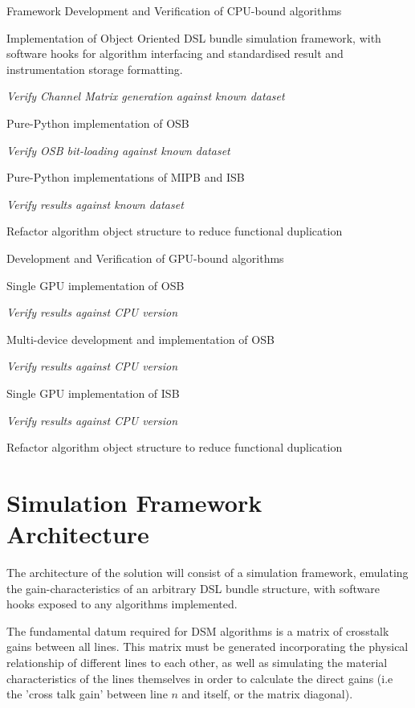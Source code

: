 \begin{enumerate*}
  \item Framework Development and Verification of CPU-bound algorithms
  \begin{enumerate*}
    \item Implementation of Object Oriented DSL bundle simulation framework, with software hooks for algorithm interfacing and standardised result and instrumentation storage formatting.
    \item \emph{Verify Channel Matrix generation against known dataset}
    \item Pure-Python implementation of OSB
    \item \emph{Verify OSB bit-loading against known dataset}
    \item Pure-Python implementations of MIPB and ISB
    \item \emph{Verify results against known dataset}
    \item Refactor algorithm object structure to reduce functional duplication
  \end{enumerate*}
  \item Development and Verification of GPU-bound algorithms
  \begin{enumerate*}
    \item Single GPU implementation of OSB
    \item \emph{Verify results against CPU version}
    \item Multi-device development and implementation of OSB
    \item \emph{Verify results against CPU version}
    \item Single GPU implementation of ISB
    \item \emph{Verify results against CPU version}
    \item Refactor algorithm object structure to reduce functional duplication
  \end{enumerate*}
\end{enumerate*}


\section{Simulation Framework Architecture}
\label{sec:arch}
The architecture of the solution will consist of a simulation framework, emulating the gain-characteristics of an arbitrary DSL bundle structure, with software hooks exposed to any algorithms implemented. 

The fundamental datum required for DSM algorithms is a matrix of crosstalk gains between all lines. This matrix must be generated incorporating the physical relationship of different lines to each other, as well as simulating the material characteristics of the lines themselves in order to calculate the direct gains (i.e the 'cross talk gain' between line \(n\) and itself, or the matrix diagonal).

